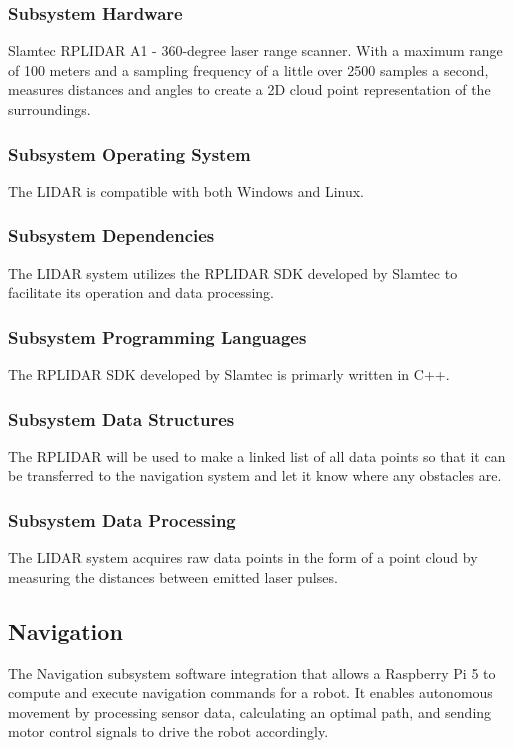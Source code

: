 \subsubsection{Subsystem Hardware}
Slamtec RPLIDAR A1 - 360-degree laser range scanner. With a maximum range of 100 meters and a sampling frequency of a little over 2500 samples a second, measures distances and angles to create a 2D cloud point representation of the surroundings.

\subsubsection{Subsystem Operating System}
The LIDAR is compatible with both Windows and Linux.

\subsubsection{Subsystem Dependencies}
The LIDAR system utilizes the RPLIDAR SDK developed by Slamtec to facilitate its operation and data processing.

\subsubsection{Subsystem Programming Languages}
The RPLIDAR SDK developed by Slamtec is primarly written in C++.

\subsubsection{Subsystem Data Structures}
The RPLIDAR will be used to make a linked list of all data points so that it can be transferred to the navigation system and let it know where any obstacles are.

\subsubsection{Subsystem Data Processing}
The LIDAR system acquires raw data points in the form of a point cloud by measuring the distances between emitted laser pulses.

\newpage

\subsection{Navigation}
The Navigation subsystem software integration that allows a Raspberry Pi 5 to compute and execute navigation commands for a robot. It enables autonomous movement by processing sensor data, calculating an optimal path, and sending motor control signals to drive the robot accordingly.

